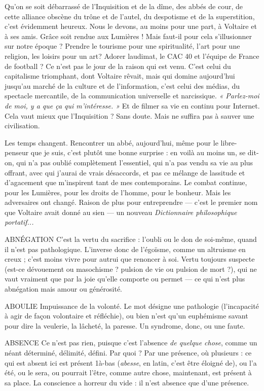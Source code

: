 Qu'on se soit débarrassé de l’Inquisition et de la dîme, des abbés de cour,
de cette alliance obscène du trône et de l’autel, du despotisme et de la superstition,
c’est évidemment heureux. Nous le devons, au moins pour une part, à
Voltaire et à ses amis. Grâce soit rendue aux Lumières ! Mais faut-il pour cela
s’illusionner sur notre époque ? Prendre le tourisme pour une spiritualité, l’art
pour une religion, les loisirs pour un art? Adorer laudimat, le CAC 40 et
l’équipe de France de football ? Ce n’est pas le jour de la raison qui est venu.
C’est celui du capitalisme triomphant, dont Voltaire rêvait, mais qui domine
aujourd’hui jusqu’au marché de la culture et de l'information, c’est celui des
médias, du spectacle mercantile, de la communication universelle et narcissique.
{\it « Parlez-moi de moi, y a que ça qui m'intéresse. »} Et de filmer sa vie en
continu pour Internet. Cela vaut mieux que l’Inquisition ? Sans doute. Mais
ne suffira pas à sauver une civilisation.

Les temps changent. Rencontrer un abbé, aujourd’hui, même pour le libre-penseur
que je suis, c’est plutôt une bonne surprise : en voilà au moins un, se
dit-on, qui n’a pas oublié complètement l'essentiel, qui n’a pas vendu sa vie au
plus offrant, avec qui j'aurai de vrais désaccords, et pas ce mélange de lassitude
et d’agacement que m'inspirent tant de mes contemporains. Le combat
continue, pour les Lumières, pour les droits de l’homme, pour le bonheur.
Mais les adversaires ont changé. Raison de plus pour entreprendre — c'est le
premier nom que Voltaire avait donné au sien — un nouveau {\it Dictionnaire philosophique
portatif...}

ABNÉGATION C’est la vertu du sacrifice : l'oubli ou le don de soi-même,
quand il n’est pas pathologique. L’inverse donc de l’égoïsme,
comme un altruisme en creux ; c’est moins vivre pour autrui que renoncer à soi.
Vertu toujours suspecte (est-ce dévouement ou masochisme ? pulsion de vie ou
pulsion de mort ?), qui ne vaut vraiment que par la joie qu’elle comporte ou
permet — ce qui n’est plus abnégation mais amour ou générosité.

ABOULIE Impuissance de la volonté. Le mot désigne une pathologie (l'incapacité
à agir de façon volontaire et réfléchie), ou bien n’est
qu’un euphémisme savant pour dire la veulerie, la lâcheté, la paresse. Un syndrome,
donc, ou une faute.

ABSENCE Ce n’est pas rien, puisque c’est l'absence {\it de quelque chose}, comme
un néant déterminé, délimité, défini. Par quoi ? Par une présence,
où plusieurs : ce qui est absent ici est présent 1à-bas ({\it abesse}, en latin, c'est
être éloigné de), ou l’a été, ou le sera, ou pourrait l’être, comme autre chose,
maintenant, est présent à sa place. La conscience a horreur du vide : il n’est
absence que d’une présence.

